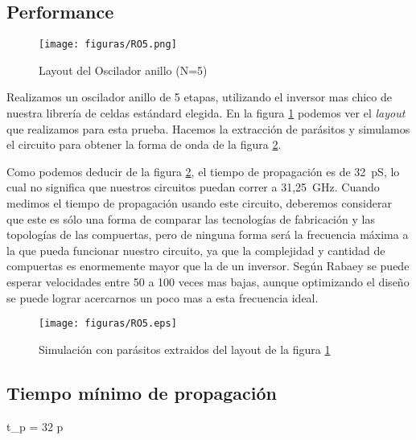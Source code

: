 \subsection{Performance}

\begin{figure}[h!]
\vspace{-5pt}
  \centering
\texttt{[image: figuras/RO5.png]}
  \caption{Layout del Oscilador anillo (N=5)}
\label{fig:RO5_lay}
\vspace{-10pt}
\end{figure}

Realizamos un oscilador anillo de 5 etapas, utilizando el inversor mas chico de nuestra librería de celdas estándard elegida. En la figura \ref{fig:RO5_lay} podemos ver el \emph{layout} que realizamos para esta prueba. Hacemos la extracción de parásitos y simulamos el circuito para obtener la forma de onda de la figura \ref{fig:RO5_wf}.

Como podemos deducir de la figura \ref{fig:RO5_wf}, el tiempo de propagación es de 32~pS, lo cual no significa que nuestros circuitos puedan correr a 31,25~GHz. Cuando medimos el tiempo de propagación usando este circuito, deberemos considerar que este es sólo una forma de comparar las tecnologías de fabricación y las topologías de las compuertas, pero de ninguna forma será la frecuencia máxima a la que pueda funcionar nuestro circuito, ya que la complejidad y cantidad de compuertas es enormemente mayor que la de un inversor. Según Rabaey\cite{rabaey2003} se puede esperar velocidades entre 50 a 100 veces mas bajas, aunque optimizando el diseño se puede lograr acercarnos un poco mas a esta frecuencia ideal. 

\begin{figure}[h!]
\vspace{-5pt}
  \centering
\texttt{[image: figuras/RO5.eps]}
  \caption{Simulación con parásitos extraidos del layout de la figura \ref{fig:RO5_lay}}
\label{fig:RO5_wf}
\vspace{-10pt}
\end{figure}


\subsection{Tiempo mínimo de propagación}
t_p = 32 p



